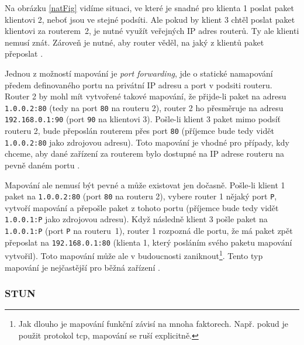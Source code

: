 Na obrázku \ref{natFig} vidíme situaci, ve které je snadné pro klienta 1 poslat
paket klientovi 2, neboť jsou ve stejné podsíti. Ale pokud by klient 3 chtěl
poslat paket klientovi za routerem~2, je nutné využít veřejných IP adres
routerů. Ty ale klienti nemusí znát. Zároveň je nutné, aby router věděl, na jaký
z klientů paket přeposlat \parencite{WebRTCForTheCurious}.

Jednou z možností mapování je \textit{port forwarding}, jde o statické
namapování předem definovaného portu na privátní IP adresu a port v podsiti
routeru. Router 2 by mohl mít vytvořené takové mapování, že přijde-li paket na
adresu \texttt{1.0.0.2:80} (tedy na port \texttt{80} na
routeru 2), router 2 ho přesměruje na adresu \texttt{192.168.0.1:90}
(port \texttt{90} na klientovi 3). Pošle-li klient 3 paket mimo podsíť
routeru 2, bude přeposlán routerem přes port \texttt{80} (příjemce
bude tedy vidět \texttt{1.0.0.2:80} jako zdrojovou adresu). Toto
mapování je vhodné pro případy, kdy chceme, aby dané zařízení za routerem bylo
dostupné na IP adrese routeru na pevně daném portu
\parencite{G2-WhatIsPortForwarding}.

Mapování ale nemusí být pevné a může existovat jen dočasně. Pošle-li klient 1
paket na \texttt{1.0.0.2:80} (port \texttt{80} na routeru
2), vybere router 1 nějaký port \texttt{P}, vytvoří mapování a
přepošle paket z tohoto portu (příjemce bude tedy vidět
\texttt{1.0.0.1:P} jako zdrojovou adresu). Když následně klient 3
pošle paket na \texttt{1.0.0.1:P} (port \texttt{P} na
routeru~1), router 1 rozpozná dle portu, že má paket zpět přeposlat na
\texttt{192.168.0.1:80} (klienta 1, který posláním svého paketu
mapování vytvořil). Toto mapování může ale v budoucnosti zaniknout\footnote{Jak
    dlouho je mapování funkční závisí na mnoha faktorech. Např. pokud je použit
    protokol \gls{tcp}, mapování se ruší explicitně.}. Tento typ mapování je
nejčastější pro běžná zařízení \parencite{WebRTCForTheCurious}.

\subsubsection{STUN}\label{stun}

